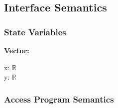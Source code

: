 \documentclass[12pt]{article}
\newcommand{\R}{$\mathbb{R}$}
\begin{document}
\subsection{Interface Semantics}

\subsubsection{State Variables} \label{SecSVVector}
\textbf{Vector:} 
\begin{multicols}{2}
	\noindent x: \R \\
	y: \R
\end{multicols}



\subsubsection{Access Program Semantics} \label{SecAPSVector}
\end{document}
